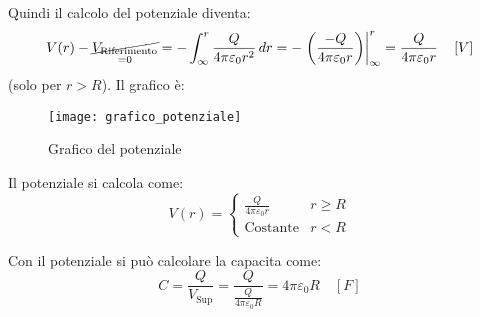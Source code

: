 \documentclass[a4paper]{article}
\begin{document}
Quindi il calcolo del potenziale diventa:
\[
  V(r) - \underset{=0}{\cancel{V_{\text{Riferimento}}}}
  = - \int_{\infty}^{r} \frac{Q}{4 \pi \varepsilon_0 r^2} \, dr
  = - \left.\left( \frac{-Q}{4 \pi \varepsilon_0 r} \right)\right|_{\infty}^{r}
    = \frac{Q}{4 \pi \varepsilon_0 r} \quad \left[ V \right]
\] 
(solo per \( r > R \)). Il grafico è:
\begin{figure}[H]
  \centering
  \texttt{[image: grafico\_potenziale]}
  \caption{Grafico del potenziale}
\end{figure}

\begin{definition}
  Il potenziale si calcola come:
  \[
    V(r) =
    \begin{cases}
      \frac{Q}{4 \pi \varepsilon_0 r} & r \ge R\\
      \text{Costante} & r < R
    \end{cases}
  \] 
\end{definition}

\vspace{1em}
\noindent
Con il potenziale si può calcolare la capacita come:
\[
  C = \frac{Q}{V_{\text{Sup}}} = \frac{Q}{\frac{Q}{4 \pi \varepsilon_0 R}}
  = 4 \pi \varepsilon_0 R \quad \left[ F \right]
\] 
\end{document}
